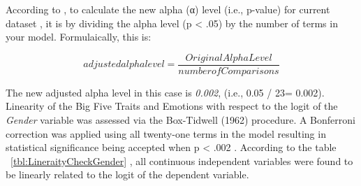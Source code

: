 \documentclass{llncs}
\begin{document}
According to \cite{Tabachnick2001}, to calculate the new alpha (α) level (i.e., p-value) for current dataset , it is by dividing the alpha level (p < .05) by the number of terms in your model. Formulaically, this is:

\begin{equation}
adjusted alpha level = \frac{OriginalAlphaLevel}{numberofComparisons}
\end{equation}

The new adjusted alpha level in this case is \textit{0.002}, (i.e., 0.05 / 23= 0.002). Linearity of the Big Five Traits and Emotions with respect to the logit of the \textit{Gender} variable was assessed via the Box-Tidwell (1962) procedure. A Bonferroni correction was applied using all twenty-one terms in the model resulting in statistical significance being accepted when p \mbox{<} .002 \cite{Tabachnick2001}. According to the table ~\ref{tbl:LineraityCheckGender} , all continuous independent variables were found to be linearly related to the logit of the dependent variable.
\end{document}
